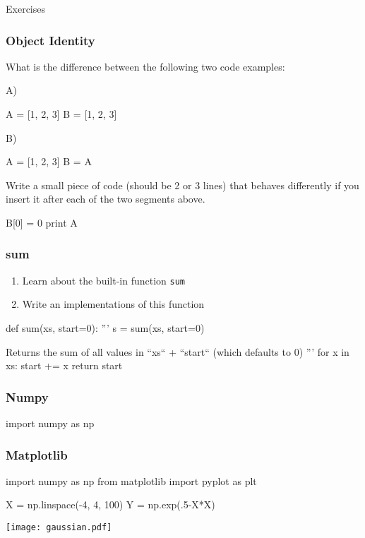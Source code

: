 \begin{frame}
{}

\bigskip
\bigskip
\bigskip
Exercises
\end{frame}

\begin{frame}[fragile]
\frametitle{Object Identity}

What is the difference between the following two code examples:

A)
\begin{python}
A = [1, 2, 3]
B = [1, 2, 3]
\end{python}

B)

\begin{python}
A = [1, 2, 3]
B = A
\end{python}

Write a small piece of code (should be 2 or 3 lines) that behaves differently
if you insert it after each of the two segments above.

\pause

\begin{python}
B[0] = 0
print A
\end{python}

\end{frame}


\begin{frame}[fragile]
\frametitle{sum}
\begin{enumerate}
\item Learn about the built-in function \lstinline{sum}
\item Write an implementations of this function
\end{enumerate}

\pause
\begin{python}
def sum(xs, start=0):
    '''
    s = sum(xs, start=0)

    Returns the sum of all values in ``xs`` + ``start`` (which defaults to 0)
    '''
    for x in xs:
        start += x
    return start
\end{python}
\end{frame}

\begin{frame}[fragile]
\frametitle{Numpy}

\begin{python}
import numpy as np
\end{python}
\end{frame}


\begin{frame}[fragile]
\frametitle{Matplotlib}

\begin{python}
import numpy as np
from matplotlib import pyplot as plt

X = np.linspace(-4, 4, 100)
Y = np.exp(.5-X*X)
\end{python}

\centering
\texttt{[image: gaussian.pdf]}

\end{frame}




